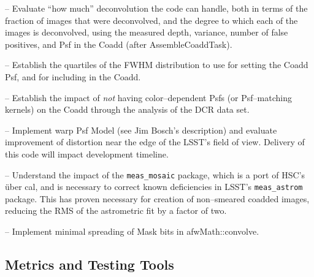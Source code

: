 \documentclass[prd, nofootinbib, floatfix, 11pt,tightenlines,times]{article}
\begin{document}




-- Evaluate ``how much'' deconvolution the code can handle, both in
terms of the fraction of images that were deconvolved, and the degree
to which each of the images is deconvolved, using the measured depth,
variance, number of false positives, and Psf in the Coadd (after AssembleCoaddTask).

-- Establish the quartiles of the FWHM distribution to use for setting
the Coadd Psf, and for including in the Coadd.

-- Establish the impact of {\it not} having color--dependent Psfs (or
Psf--matching kernels) on the Coadd through the analysis of the DCR
data set.

-- Implement warp Psf Model (see Jim Bosch's description) and evaluate
improvement of distortion near the edge of the LSST's field of
view. Delivery of this code will impact development timeline.

-- Understand the impact of the {\tt meas\_mosaic} package, which is a
port of HSC's \"{u}ber cal, and is necessary to correct known
deficiencies in LSST's {\tt meas\_astrom} package.  This has proven
necessary for creation of non--smeared coadded images, reducing the
RMS of the astrometric fit by a factor of two.

-- Implement minimal spreading of Mask bits in afwMath::convolve.

%
%
%
%
%

\subsection{Metrics and Testing Tools}
\end{document}
